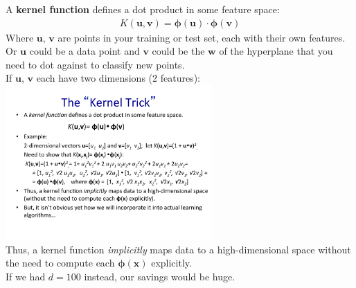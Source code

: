 A \textbf{kernel function} defines a dot product in some feature space: 
\begin{align*}
	K(\bm{u}, \bm{v}) =\bm{\phi}(\bm{u}) \cdot \bm{\phi}(\bm{v})
\end{align*}
Where $\bm{u}$, $\bm{v}$ are points in your training or test set, each with their own features. \hfill \\ 
Or $\bm{u}$ could be a data point and $\bm{v}$ could be the $\bm{w}$ of the hyperplane that you need to dot against to classify new points.
 \hfill \\
 
 If $\bm{u}$, $\bm{v}$ each have two dimensions (2 features): \hfill \\

\includegraphics[width=3.1in]{figures/example_kernel_math.pdf} \hfill \\
Thus, a kernel function \textit{implicitly} maps data to a high-dimensional space without the need to compute each $\bm{\phi}(\bm{x})$ explicitly.   \hfill \\
If we had $d = 100$ instead, our savings would be huge. 
 \hfill \\

